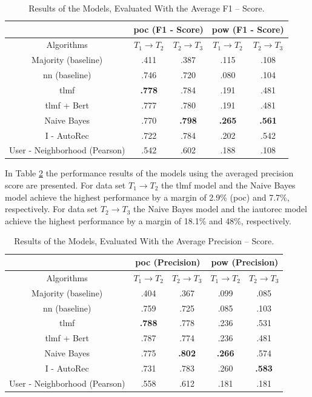 \begin{table}[h!]
    \centering
    \begin{tabular}{|c|c|c|c|c|}
    \hline
     & \multicolumn{2}{|c|}{\acrshort{poc} (F1 - Score)} & \multicolumn{2}{|c|}{\acrshort{pow} (F1 - Score)} \\
     \hline
    Algorithms & $T_1 \to T_2$ & $T_2 \to T_3$ & $T_1 \to T_2$ & $T_2 \to T_3$\\
    \hline  Majority (baseline) & .411 & .387 & .115 & .108 \\ 
    \acrshort{nn} (baseline) & .746 & .720 & .080 & .104\\
    \acrshort{tlmf} & \textbf{.778} & .784 & .191 & .481\\
    \acrshort{tlmf} + Bert & .777 & .780  & .191 & .481 \\
    Naive Bayes & .770 & \textbf{.798} & \textbf{.265} & \textbf{.561} \\
    I - AutoRec & .722 & .784 & .202 & .542\\
    User - Neighborhood (Pearson) & .542 & .602 & .188 & .108\\
    \hline
    \end{tabular}
    \caption{Results of the Models, Evaluated With the Average F1 – Score.}
    \label{tab:results_f1_mean}
\end{table}
\noindent In Table \ref{tab:results_precision_mean} the performance results of the models using the averaged precision score are presented. For data set $T_1 \to T_2$ the \acrshort{tlmf} model and the Naive Bayes model achieve the highest performance by a margin of 2.9\% (\acrshort{poc}) and 7.7\%, respectively. For data set $T_2 \to T_3$ the Naive Bayes model and the \acrshort{iautorec} model achieve the highest performance by a margin of 18.1\% and 48\%, respectively.
\begin{table}[h!]
    \centering
    \begin{tabular}{|c|c|c|c|c|}
    \hline
     & \multicolumn{2}{|c|}{\acrshort{poc} (Precision)} & \multicolumn{2}{|c|}{\acrshort{pow} (Precision)} \\
     \hline
    Algorithms & $T_1 \to T_2$ & $T_2 \to T_3$ & $T_1 \to T_2$ & $T_2 \to T_3$\\
    \hline  Majority (baseline) & .404 & .367 & .099 & .085 \\ 
    \acrshort{nn} (baseline) & .759 & .725 & .085 & .103\\
    \acrshort{tlmf} & \textbf{.788} & .778 & .236 & .531 \\
    \acrshort{tlmf} + Bert & .787 & .774 & .236 & .481\\
    Naive Bayes & .775 & \textbf{.802} & \textbf{.266} & .574 \\
    I - AutoRec & .731 & .783 & .260 & \textbf{.583}\\
    User - Neighborhood (Pearson) & .558 & .612 & .181 & .181\\
    \hline
    \end{tabular}
    \caption{Results of the Models, Evaluated With the Average Precision – Score.}
    \label{tab:results_precision_mean}
\end{table}\\
